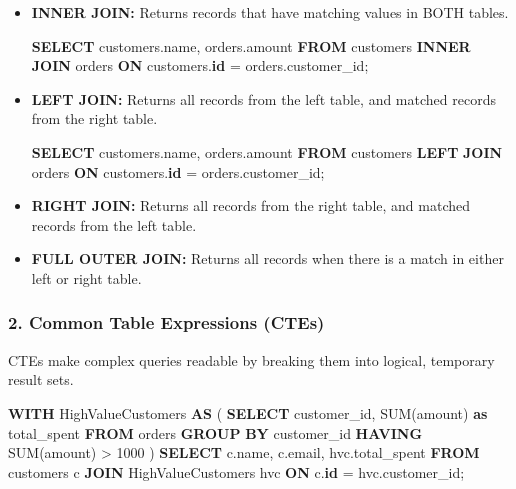 \documentclass[
  11pt,
  openany,
  oneside]{book}
\newenvironment{Shaded}{}{}
\newcommand{\DecValTok}[1]{\textcolor[rgb]{0.25,0.63,0.44}{#1}}
\newcommand{\FunctionTok}[1]{\textcolor[rgb]{0.02,0.16,0.49}{#1}}
\newcommand{\KeywordTok}[1]{\textcolor[rgb]{0.00,0.44,0.13}{\textbf{#1}}}
\newcommand{\NormalTok}[1]{#1}
\newcommand{\OperatorTok}[1]{\textcolor[rgb]{0.40,0.40,0.40}{#1}}
\begin{document}
\begin{itemize}
\item
  \textbf{INNER JOIN:} Returns records that have matching values in BOTH
  tables.

\begin{Shaded}
\begin{Highlighting}[]
\KeywordTok{SELECT}\NormalTok{ customers.name, orders.amount }
\KeywordTok{FROM}\NormalTok{ customers }
\KeywordTok{INNER} \KeywordTok{JOIN}\NormalTok{ orders }\KeywordTok{ON}\NormalTok{ customers.}\KeywordTok{id} \OperatorTok{=}\NormalTok{ orders.customer\_id;}
\end{Highlighting}
\end{Shaded}
\item
  \textbf{LEFT JOIN:} Returns all records from the left table, and
  matched records from the right table.

\begin{Shaded}
\begin{Highlighting}[]
\KeywordTok{SELECT}\NormalTok{ customers.name, orders.amount }
\KeywordTok{FROM}\NormalTok{ customers }
\KeywordTok{LEFT} \KeywordTok{JOIN}\NormalTok{ orders }\KeywordTok{ON}\NormalTok{ customers.}\KeywordTok{id} \OperatorTok{=}\NormalTok{ orders.customer\_id;}
\end{Highlighting}
\end{Shaded}
\item
  \textbf{RIGHT JOIN:} Returns all records from the right table, and
  matched records from the left table.
\item
  \textbf{FULL OUTER JOIN:} Returns all records when there is a match in
  either left or right table.
\end{itemize}

\subsubsection{2. Common Table Expressions
(CTEs)}\label{common-table-expressions-ctes-1}

CTEs make complex queries readable by breaking them into logical,
temporary result sets.

\begin{Shaded}
\begin{Highlighting}[]
\KeywordTok{WITH}\NormalTok{ HighValueCustomers }\KeywordTok{AS}\NormalTok{ (}
    \KeywordTok{SELECT}\NormalTok{ customer\_id, }\FunctionTok{SUM}\NormalTok{(amount) }\KeywordTok{as}\NormalTok{ total\_spent}
    \KeywordTok{FROM}\NormalTok{ orders}
    \KeywordTok{GROUP} \KeywordTok{BY}\NormalTok{ customer\_id}
    \KeywordTok{HAVING} \FunctionTok{SUM}\NormalTok{(amount) }\OperatorTok{\textgreater{}} \DecValTok{1000}
\NormalTok{)}
\KeywordTok{SELECT}\NormalTok{ c.name, c.email, hvc.total\_spent}
\KeywordTok{FROM}\NormalTok{ customers c}
\KeywordTok{JOIN}\NormalTok{ HighValueCustomers hvc }\KeywordTok{ON}\NormalTok{ c.}\KeywordTok{id} \OperatorTok{=}\NormalTok{ hvc.customer\_id;}
\end{Highlighting}
\end{Shaded}
\end{document}
